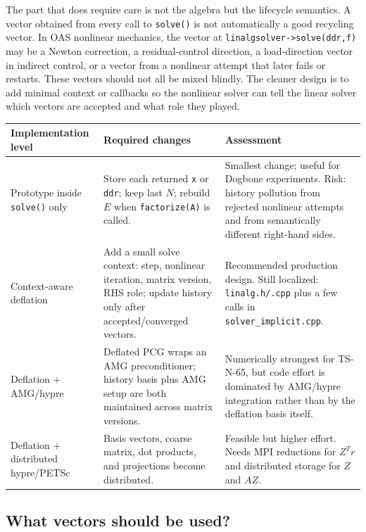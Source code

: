 \documentclass[10pt,a4paper]{article}
\newcommand{\code}[1]{\texttt{#1}}
\begin{document}
The part that does require care is not the algebra but the lifecycle semantics. A vector obtained from every call to \code{solve()} is not automatically a good recycling vector. In OAS nonlinear mechanics, the vector at \code{linalgsolver->solve(ddr,f)} may be a Newton correction, a residual-control direction, a load-direction vector in indirect control, or a vector from a nonlinear attempt that later fails or restarts. These vectors should not all be mixed blindly. The cleaner design is to add minimal context or callbacks so the nonlinear solver can tell the linear solver which vectors are accepted and what role they played.

\begin{table}[h]
\small
\centering
\begin{tabularx}{\textwidth}{L{0.24\textwidth} L{0.30\textwidth} Y}
\toprule
Implementation level & Required changes & Assessment \\
\midrule
Prototype inside \code{solve()} only & Store each returned \code{x} or \code{ddr}; keep last $N$; rebuild $E$ when \code{factorize(A)} is called. & Smallest change; useful for Dogbone experiments. Risk: history pollution from rejected nonlinear attempts and from semantically different right-hand sides. \\
Context-aware deflation & Add a small solve context: step, nonlinear iteration, matrix version, RHS role; update history only after accepted/converged vectors. & Recommended production design. Still localized: \code{linalg.h/.cpp} plus a few calls in \code{solver\_implicit.cpp}. \\
Deflation + AMG/hypre & Deflated PCG wraps an AMG preconditioner; history basis plus AMG setup are both maintained across matrix versions. & Numerically strongest for TS-N-65, but code effort is dominated by AMG/hypre integration rather than by the deflation basis itself. \\
Deflation + distributed hypre/PETSc & Basis vectors, coarse matrix, dot products, and projections become distributed. & Feasible but higher effort. Needs MPI reductions for $Z^T r$ and distributed storage for $Z$ and $AZ$. \\
\bottomrule
\end{tabularx}
\end{table}

\subsection*{What vectors should be used?}
\end{document}

